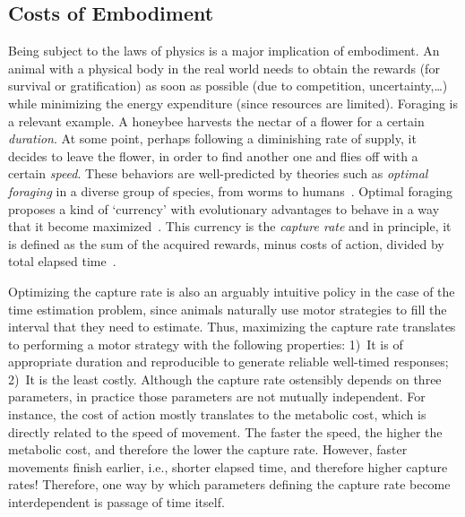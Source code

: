 \subsection{Costs of Embodiment}
\label{ch:intro:cost}
Being subject to the laws of physics is a major implication of embodiment.
An animal with a physical body in the real world needs to obtain the rewards (for survival or gratification) as soon as possible (due to competition, uncertainty,\ldots) while minimizing the energy expenditure (since resources are limited).
Foraging is a relevant example.
A honeybee harvests the nectar of a flower for a certain \textit{duration}.
At some point, perhaps following a diminishing rate of supply, it decides to leave the flower, in order to find another one and flies off with a certain \textit{speed}.
These behaviors are well-predicted by theories such as \emph{optimal foraging} in a diverse group of species, from worms to humans~\cite{Yoon2018PNAS}.
Optimal foraging proposes a kind of `currency' with evolutionary advantages to behave in a way that it become maximized~\cite{Shadmehr2019TINS,Carland2019NeuroSci}.
This currency is the \emph{capture rate} and in principle, it is defined as the sum of the acquired rewards\footnotemark, minus costs of action, divided by total elapsed time~\cite{Shadmehr2019TINS}.
\par
Optimizing the capture rate is also an arguably intuitive policy in the case of the time estimation problem, since animals naturally use motor strategies to fill the interval that they need to estimate.
Thus, maximizing the capture rate translates to performing a motor strategy with the following properties:
    1)~It is of appropriate duration and reproducible to generate reliable well-timed responses;
    2)~It is the least costly.
Although the capture rate ostensibly depends on three parameters, in practice those parameters are not mutually independent.
For instance, the cost of action mostly translates to the metabolic cost, which is directly related to the speed of movement.
The faster the speed, the higher the metabolic cost, and therefore the lower the capture rate.
However, faster movements finish earlier, i.e., shorter elapsed time, and therefore higher capture rates!
Therefore, one way by which parameters defining the capture rate become interdependent is passage of time itself.


